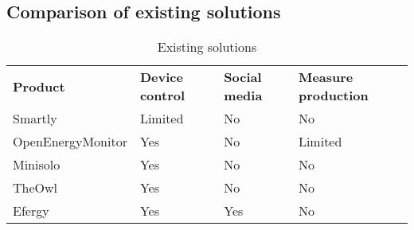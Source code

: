 \subsection{Comparison of existing solutions}
\begin{table}[H]
\centering
{}
\begin{tabular}{|l|l|l|l|}
\hline
\textbf{Product} & \textbf{Device control} & \textbf{Social media} & \textbf{Measure production}\\
Smartly & Limited & No  & No \\
OpenEnergyMonitor & Yes & No  & Limited \\
Minisolo & Yes & No  & No \\
TheOwl & Yes & No & No \\
Efergy & Yes & Yes &  No \\\hline
\end{tabular}
\caption{Existing solutions}
\label{tab:existingSolutions}
\end{table}
